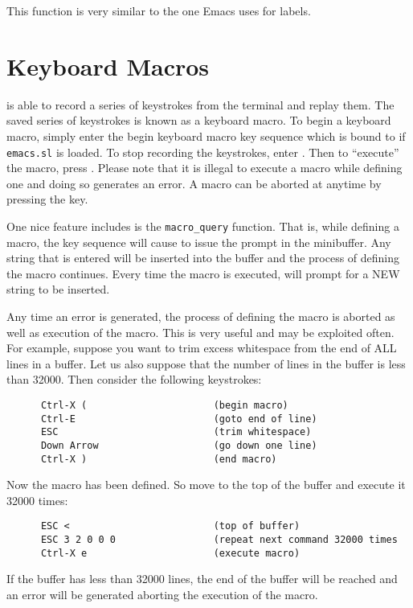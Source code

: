   This function is very similar to the one Emacs uses for labels.

\section{Keyboard Macros}

  \jed{} is able to record a series of keystrokes from the terminal and replay
  them.  The saved series of keystrokes is known as a keyboard macro.  To
  begin a keyboard macro, simply enter the begin keyboard macro key sequence
  which is bound to  if \verb|emacs.sl| is loaded.  To stop
  recording the keystrokes, enter .  Then to ``execute'' the
  macro, press . Please note that it is illegal to execute a
  macro while defining one and doing so generates an error.  A macro can be
  aborted at anytime by pressing the  key.

  One nice feature \jed{} includes is the \verb|macro_query| function.  That
  is, while defining a macro, the key sequence  will cause
  \jed{} to issue the prompt  in the minibuffer.  Any
  string that is entered will be inserted into the buffer and the process of
  defining the macro continues. Every time the macro is executed, \jed{}
  will prompt for a NEW string to be inserted.

  Any time an error is generated, the process of defining the macro is
  aborted as well as execution of the macro.  This is very useful and may be
  exploited often.  For example, suppose you want to trim excess whitespace
  from the end of ALL lines in a buffer.  Let us also suppose that the
  number of lines in the buffer is less than 32000.  Then consider the
  following keystrokes:
\begin{verbatim}
      Ctrl-X (                      (begin macro)
      Ctrl-E                        (goto end of line)
      ESC                           (trim whitespace)
      Down Arrow                    (go down one line)
      Ctrl-X )                      (end macro)
\end{verbatim} 

Now the macro has been defined.  So move to the top of the buffer and
execute it 32000 times:
\begin{verbatim}
      ESC <                         (top of buffer)
      ESC 3 2 0 0 0                 (repeat next command 32000 times
      Ctrl-X e                      (execute macro)
\end{verbatim}
If the buffer has less than 32000 lines, the end of the buffer will be
reached and an error will be generated aborting the execution of the macro.


